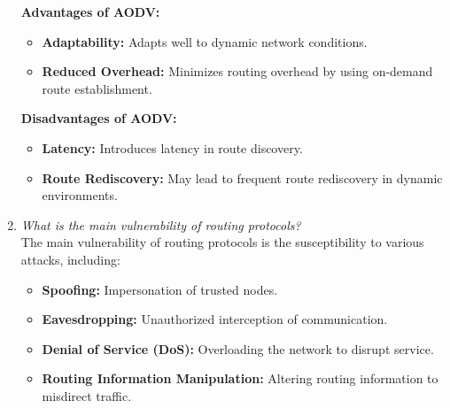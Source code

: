 \documentclass[11pt]{article}
\begin{document}
\begin{enumerate}
          \textbf{Advantages of AODV:}
          \begin{itemize}
              \item \textbf{Adaptability:} Adapts well to dynamic network conditions.
              \item \textbf{Reduced Overhead:} Minimizes routing overhead by using on-demand route establishment.
          \end{itemize}

          \textbf{Disadvantages of AODV:}
          \begin{itemize}
              \item \textbf{Latency:} Introduces latency in route discovery.
              \item \textbf{Route Rediscovery:} May lead to frequent route rediscovery in dynamic environments.
          \end{itemize}

    \item \textit{What is the main vulnerability of routing protocols?}\\

          The main vulnerability of routing protocols is the susceptibility to various attacks, including:
          \begin{itemize}
              \item \textbf{Spoofing:} Impersonation of trusted nodes.
              \item \textbf{Eavesdropping:} Unauthorized interception of communication.
              \item \textbf{Denial of Service (DoS):} Overloading the network to disrupt service.
              \item \textbf{Routing Information Manipulation:} Altering routing information to misdirect traffic.
          \end{itemize}

\end{enumerate}
\end{document}
